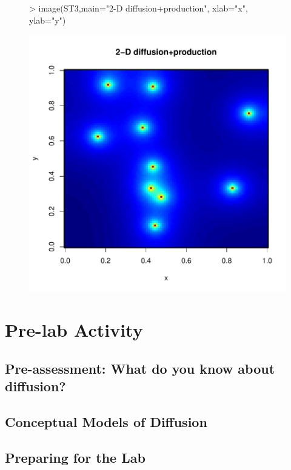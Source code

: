 \documentclass{article}
\begin{document}
\begin{figure}
\begin{Schunk}
\begin{Sinput}
> image(ST3,main="2-D diffusion+production", xlab="x", ylab="y")
\end{Sinput}
\end{Schunk}
\includegraphics{AdvectionDiffusionProject-CreateImage}
\end{figure}
\section{Pre-lab Activity}

\subsection{Pre-assessment: What do you know about diffusion?}

\subsection{Conceptual Models of Diffusion}


\subsection{Preparing for the Lab}
\end{document}
